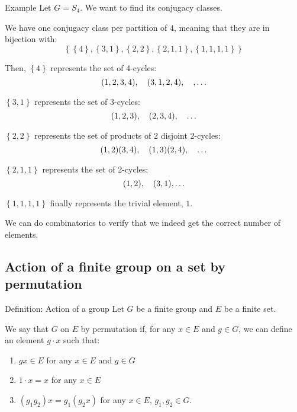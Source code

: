 \documentclass[a4paper]{article}
\begin{document}
\begin{parag}{Example}
    Let $G = S_4$. We want to find its conjugacy classes.

    We have one conjugacy class per partition of $4$, meaning that they are in bijection with: 
    \[\left\{\left\{4\right\}, \left\{3, 1\right\}, \left\{2, 2\right\}, \left\{2, 1, 1\right\}, \left\{1, 1, 1, 1\right\}\right\}\]
    
    Then, $\left\{4\right\}$ represents the set of 4-cycles: 
    \[\left(1, 2, 3, 4\right), \mathspace \left(3, 1, 2, 4\right), \mathspace, \ldots\]
    
    $\left\{3, 1\right\}$ represents the set of 3-cycles: 
    \[\left(1, 2, 3\right), \mathspace \left(2, 3, 4\right), \mathspace \ldots\]
    
    $\left\{2, 2\right\}$ represents the set of products of 2 disjoint 2-cycles: 
    \[\left(1, 2\right)\left(3, 4\right), \mathspace \left(1, 3\right)\left(2, 4\right), \mathspace \ldots\]

    $\left\{2, 1, 1\right\}$ represents the set of 2-cycles: 
    \[\left(1, 2\right), \mathspace \left(3, 1\right), \ldots\]
    
    $\left\{1, 1, 1, 1\right\}$ finally represents the trivial element, $1$.
    
    We can do combinatorics to verify that we indeed get the correct number of elements.
\end{parag}

\subsection{Action of a finite group on a set by permutation}

\begin{parag}{Definition: Action of a group}
    Let $G$ be a finite group and $E$ be a finite set.

    We say that $G$  on $E$ by permutation if, for any $x \in E$ and $g \in G$, we can define an element $g\cdot x$ such that:
    \begin{enumerate}
        \item $gx \in E$ for any $x \in E$ and $g \in G$
        \item $1\cdot x = x$ for any $x \in E$
        \item $\left(g_1 g_2\right) x = g_1 \left(g_2 x\right)$ for any $x \in E$, $g_1, g_2 \in G$.
    \end{enumerate}
\end{parag}
\end{document}
